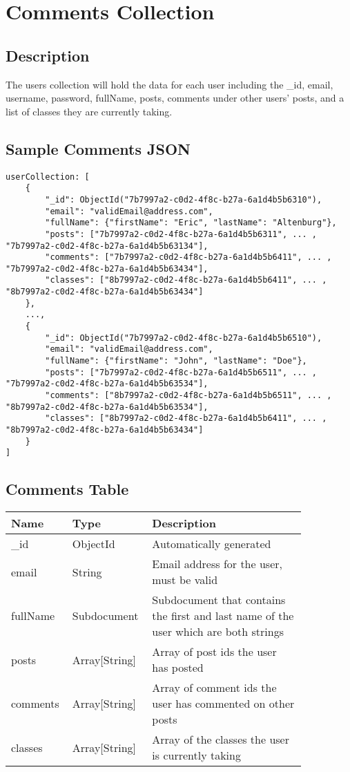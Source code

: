 \documentclass[preprint,11pt,3p]{article}
\begin{document}
\newpage

\section{Comments Collection}

\subsection{Description}
	The users collection will hold the data for each user including the _id, email, username, password, fullName, posts, comments under other users' posts, and a list of classes they are currently taking.

\subsection{Sample Comments JSON}
\begin{lstlisting}
userCollection: [
	{
		"_id": ObjectId("7b7997a2-c0d2-4f8c-b27a-6a1d4b5b6310"),
		"email": "validEmail@address.com",
		"fullName": {"firstName": "Eric", "lastName": "Altenburg"},
		"posts": ["7b7997a2-c0d2-4f8c-b27a-6a1d4b5b6311", ... , "7b7997a2-c0d2-4f8c-b27a-6a1d4b5b63134"],
		"comments": ["7b7997a2-c0d2-4f8c-b27a-6a1d4b5b6411", ... , "7b7997a2-c0d2-4f8c-b27a-6a1d4b5b63434"],
		"classes": ["8b7997a2-c0d2-4f8c-b27a-6a1d4b5b6411", ... , "8b7997a2-c0d2-4f8c-b27a-6a1d4b5b63434"]
	},
	...,
	{
		"_id": ObjectId("7b7997a2-c0d2-4f8c-b27a-6a1d4b5b6510"),
		"email": "validEmail@address.com",
		"fullName": {"firstName": "John", "lastName": "Doe"},
		"posts": ["7b7997a2-c0d2-4f8c-b27a-6a1d4b5b6511", ... , "7b7997a2-c0d2-4f8c-b27a-6a1d4b5b63534"],
		"comments": ["8b7997a2-c0d2-4f8c-b27a-6a1d4b5b6511", ... , "8b7997a2-c0d2-4f8c-b27a-6a1d4b5b63534"],
		"classes": ["8b7997a2-c0d2-4f8c-b27a-6a1d4b5b6411", ... , "8b7997a2-c0d2-4f8c-b27a-6a1d4b5b63434"]
	}
]
\end{lstlisting}

\subsection{Comments Table}
\begingroup
\setlength{\tabcolsep}{15pt} %
\renewcommand{\arraystretch}{1.5} %
\begin{tabular}{| p{0.15\linewidth} | p{0.20\linewidth} | p{0.5\linewidth} |}
	\hline
	\textbf{Name} & \textbf{Type} & \textbf{Description} \\
	\hline
	_id & ObjectId & Automatically generated\\
	\hline
	email & String & Email address for the user, must be valid\\
	\hline
	fullName & Subdocument & Subdocument that contains the first and last name of the user which are both strings\\
	\hline
	posts & Array[String] & Array of post ids the user has posted\\
	\hline
	comments & Array[String] & Array of comment ids the user has commented on other posts\\
	\hline
	classes & Array[String] & Array of the classes the user is currently taking\\
	\hline
\end{tabular}
\endgroup
\end{document}
